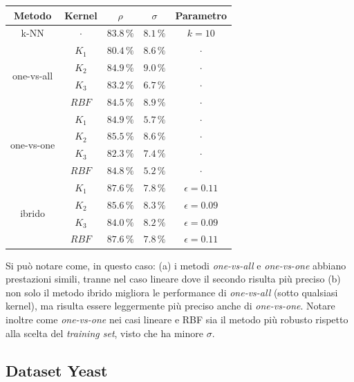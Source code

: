 \begin{center}
\begin{tabular}{ |c|c|c|c|c| } 
\hline
Metodo & Kernel & $\rho$ & $\sigma$ & Parametro \\
\hline

\multirow{1}{*}{k-NN}
& $\cdot$ & $83.8 \,\%$ & $8.1 \,\%$ & $k = 10$ \\ 
\hline

\multirow{4}{*}{one-vs-all}
& $K_1$ & $80.4 \,\%$ & $8.6 \,\%$ & $\cdot$ \\ 
& $K_2$ & $84.9 \,\%$ & $9.0 \,\%$ & $\cdot$ \\ 
& $K_3$ & $83.2 \,\%$ & $6.7 \,\%$ & $\cdot$ \\ 
& $RBF$ & $84.5 \,\%$ & $8.9 \,\%$ & $\cdot$ \\ 
\hline

\multirow{4}{*}{one-vs-one}
& $K_1$ & $84.9 \,\%$ & $5.7 \,\%$ & $\cdot$ \\ 
& $K_2$ & $85.5 \,\%$ & $8.6 \,\%$ & $\cdot$ \\ 
& $K_3$ & $82.3 \,\%$ & $7.4 \,\%$ & $\cdot$ \\ 
& $RBF$ & $84.8 \,\%$ & $5.2 \,\%$ & $\cdot$ \\ 
\hline

\multirow{4}{*}{ibrido}
& $K_1$ & $87.6 \,\%$ & $7.8 \,\%$ & $\epsilon = 0.11$ \\ 
& $K_2$ & $85.6 \,\%$ & $8.3 \,\%$ & $\epsilon = 0.09$ \\ 
& $K_3$ & $84.0 \,\%$ & $8.2 \,\%$ & $\epsilon = 0.09$ \\ 
& $RBF$ & $87.6 \,\%$ & $7.8 \,\%$ & $\epsilon = 0.11$ \\ 
\hline

\end{tabular}
\end{center}

Si può notare come, in questo caso: (a) i metodi \textit{one-vs-all} e \textit{one-vs-one} abbiano prestazioni simili, tranne nel caso lineare dove il secondo risulta più preciso (b) non solo il metodo ibrido migliora le performance di \textit{one-vs-all} (sotto qualsiasi kernel), ma risulta essere leggermente più preciso anche di \textit{one-vs-one}.
Notare inoltre come \textit{one-vs-one} nei casi lineare e RBF sia il metodo più robusto rispetto alla scelta del \textit{training set}, visto che ha minore $\sigma$.

\subsection{Dataset Yeast} %

